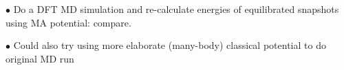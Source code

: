 \documentclass[aps,prb,twocolumn,amsmath,amssymb,superscriptaddress,longbibliography]{revtex4-1}
\begin{document}
$\bullet$ Do a DFT MD simulation and re-calculate energies of equilibrated snapshots using MA potential: compare.

$\bullet$ Could also try using more elaborate (many-body) classical potential to do original MD run




\end{document}
